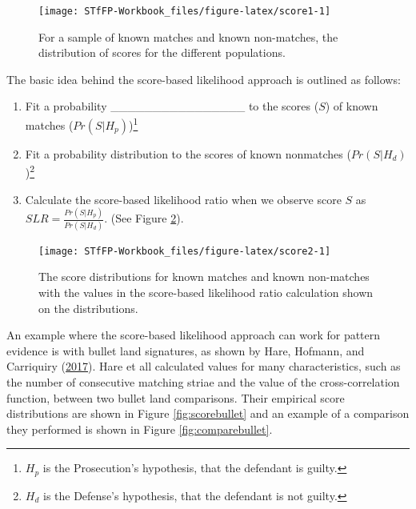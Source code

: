 \documentclass[]{book}
\providecommand{\tightlist}{%
  \setlength{\itemsep}{0pt}\setlength{\parskip}{0pt}}
\let\rmarkdownfootnote\footnote%
\def\footnote{\protect\rmarkdownfootnote}
\theoremstyle{definition}
\theoremstyle{definition}
\theoremstyle{remark}
\begin{document}
\begin{figure}

{\centering \texttt{[image: STfFP-Workbook\_files/figure-latex/score1-1]} 

}

\caption{For a sample of known matches and known non-matches, the distribution of scores for the different populations.}\label{fig:score1}
\end{figure}

The basic idea behind the score-based likelihood approach is outlined as
follows:

\begin{enumerate}
\def\labelenumi{\arabic{enumi}.}
\tightlist
\item
  Fit a probability \_\_\_\_\_\_\_\_\_\_\_\_\_\_\_\_ to the scores
  (\(S\)) of known matches (\(Pr(S|H_p)\))\footnote{\(H_p\) is the
    Prosecution's hypothesis, that the defendant is guilty.}
  \vspace{.1in}
\item
  Fit a probability distribution to the scores of known nonmatches
  (\(Pr(S|H_d)\))\footnote{\(H_d\) is the Defense's hypothesis, that the
    defendant is not guilty.} \vspace{.1in}
\item
  Calculate the score-based likelihood ratio when we observe score \(S\)
  as \(SLR = \frac{Pr(S|H_p)}{Pr(S|H_d)}\). (See Figure
  \ref{fig:score2}).
\end{enumerate}

\begin{figure}

{\centering \texttt{[image: STfFP-Workbook\_files/figure-latex/score2-1]} 

}

\caption{The score distributions for known matches and known non-matches with the values in the score-based likelihood ratio calculation shown on the distributions.}\label{fig:score2}
\end{figure}

An example where the score-based likelihood approach can work for
pattern evidence is with bullet land signatures, as shown by Hare,
Hofmann, and Carriquiry (\protect\hyperlink{ref-hare}{2017}). Hare et
all calculated values for many characteristics, such as the number of
consecutive matching striae and the value of the cross-correlation
function, between two bullet land comparisons. Their empirical score
distributions are shown in Figure \ref{fig:scorebullet} and an example
of a comparison they performed is shown in Figure
\ref{fig:comparebullet}.
\end{document}

